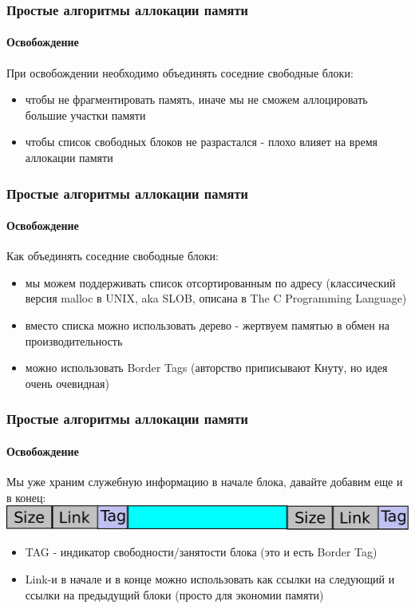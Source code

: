 \begin{frame}
\frametitle{Простые алгоритмы аллокации памяти}
\framesubtitle{Освобождение}

При освобождении необходимо объединять соседние свободные блоки:
\begin{itemize}
  \item<2-> чтобы не фрагментировать память, иначе мы не сможем аллоцировать большие участки памяти
  \item<3-> чтобы список свободных блоков не разрастался - плохо влияет на время аллокации памяти
\end{itemize}

\end{frame}

\begin{frame}
\frametitle{Простые алгоритмы аллокации памяти}
\framesubtitle{Освобождение}

Как объединять соседние свободные блоки:
\begin{itemize}
  \item<2-> мы можем поддерживать список отсортированным по адресу (классический версия malloc в UNIX, aka SLOB, описана в The C Programming Language)
  \item<3-> вместо списка можно использовать дерево - жертвуем памятью в обмен на производительность
  \item<4-> можно использовать Border Tags (авторство приписывают Кнуту, но идея очень очевидная)
\end{itemize}

\end{frame}

\begin{frame}
\frametitle{Простые алгоритмы аллокации памяти}
\framesubtitle{Освобождение}

Мы уже храним служебную информацию в начале блока, давайте добавим еще и в конец:
\includegraphics[width=.9\linewidth]{alloc-tag0}

\begin{itemize}
  \item<2-> TAG - индикатор свободности/занятости блока (это и есть Border Tag)
  \item<3-> Link-и в начале и в конце можно использовать как ссылки на следующий и ссылки на предыдущий блоки (просто для экономии памяти)
\end{itemize}

\end{frame}

